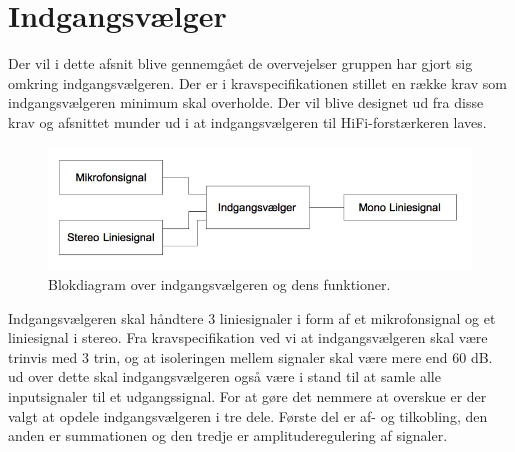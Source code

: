 \chapter{Indgangsvælger}
\label{indgangsvaelger}
Der vil i dette afsnit blive gennemgået de overvejelser gruppen har gjort sig omkring indgangsvælgeren. Der er i kravspecifikationen stillet en række krav som indgangsvælgeren minimum skal overholde. Der vil blive designet ud fra disse krav og afsnittet munder ud i at indgangsvælgeren til HiFi-forstærkeren laves.

\begin{figure}[h]
\centering
\includegraphics[scale=0.6]{teknisk/indgangsvaelger/overordnetdesign.png}
\caption{Blokdiagram over indgangsvælgeren og dens funktioner.}
\label{indgangsvaelger-overordnet}
\end{figure}

Indgangsvælgeren skal håndtere 3 liniesignaler i form af et mikrofonsignal og et liniesignal i stereo. Fra kravspecifikation ved vi at indgangsvælgeren skal være trinvis med 3 trin, og at isoleringen mellem signaler skal være mere end 60 dB. ud over dette skal indgangsvælgeren også være i stand til at samle alle inputsignaler til et udgangssignal. For at gøre det nemmere at overskue er der valgt at opdele indgangsvælgeren i tre dele. Første del er af- og tilkobling, den anden er summationen og den tredje er amplituderegulering af signaler.



